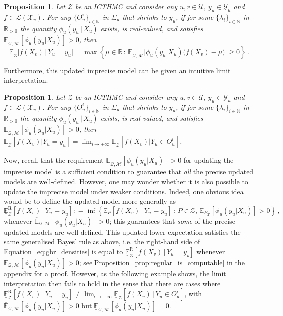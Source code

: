 \documentclass[3p]{elsarticle}
\newtheorem{proposition}[theorem]{Proposition}
\newcommand{\nats}{\mathbb{N}}
\newcommand{\reals}{\mathbb{R}}
\newcommand{\realspos}{\reals_{>0}}
\newcommand{\states}{\mathcal{X}}
\newcommand{\observs}{\mathcal{Y}}
\newcommand{\lexp}{\underline{\mathbb{E}}_{\rateset,\mathcal{M}}}
\newcommand{\uexp}{\overline{\mathbb{E}}_{\rateset,\mathcal{M}}}
\newcommand{\gambles}{\mathcal{L}}
\newcommand{\rateset}{\mathcal{Q}}
\newcommand{\coloneqq}{:\!=}
\begin{document}
\begin{proposition}\label{prop:GBR_for_densities_lower_zero}
Let $\mathcal{Z}$ be an ICTHMC and consider any $u,v\in\mathcal{U}$, $y_u\in\observs_u$ and $f\in\gambles(\states_v)$. For any $\{O_u^i\}_{i\in\nats}$ in $\Sigma_u$ that shrinks to $y_u$, if for some $\{\lambda_i\}_{i\in\nats}$ in $\realspos$ the quantity $\phi_u(y_u\,\vert\,X_u)$ exists, is real-valued, and satisfies $\lexp[\phi_u(y_u\vert X_u)]>0$, then
\begin{equation}\label{eq:gbr_densities}
\underline{\mathbb{E}}_{\mathcal{Z}}\bigl[f(X_v)\,\vert\,Y_u = y_u\bigr] = \max\left\{\mu\in\reals\,:\, \lexp\bigl[\phi_u(y_u\vert X_u)\bigl(f(X_v) - \mu\bigr)\bigr] \geq 0\right\}\,.
\end{equation}
\end{proposition}
Furthermore, this updated imprecise model can be given an intuitive limit interpretation.
\begin{proposition}\label{prop:GBR_for_densities_is_limit_if_continuous}
Let $\mathcal{Z}$ be an ICTHMC and consider any $u,v\in\mathcal{U}$, $y_u\in\observs_u$ and $f\in\gambles(\states_v)$. For any $\{O_u^i\}_{i\in\nats}$ in $\Sigma_u$ that shrinks to $y_u$, if for some $\{\lambda_i\}_{i\in\nats}$ in $\realspos$ the quantity $\phi_u(y_u\,\vert\,X_u)$ exists, is real-valued, and satisfies $\lexp[\phi_u(y_u\vert X_u)]>0$, then $\underline{\mathbb{E}}_\mathcal{Z}[f(X_v)\vert Y_u=y_u] 
 = \lim_{i\to+\infty}\underline{\mathbb{E}}_\mathcal{Z}[f(X_v)\vert Y_u\in O_u^i]$.
\end{proposition}

Now, recall that the requirement $\lexp[\phi_u(y_u\vert X_u)]>0$ for updating the imprecise model is a sufficient condition to guarantee that \emph{all} the precise updated models are well-defined. However, one may wonder whether it is also possible to update the imprecise model under weaker conditions. Indeed, one obvious idea would be to define the updated model more generally as
\begin{equation*}
\underline{\mathbb{E}}_\mathcal{Z}^\mathrm{R}[f(X_v)\,\vert\,Y_u=y_u] \coloneqq \inf\left\{ \mathbb{E}_P[f(X_v)\,\vert\,Y_u=y_u]\,:\, P\in\mathcal{Z},\,\mathbb{E}_{P_\states}[\phi_u(y_u\vert X_u)]>0 \right\}\,,
\end{equation*}
whenever $\uexp[\phi_u(y_u\vert X_u)]>0$; this guarantees that \emph{some} of the precise updated models are well-defined. This updated lower expectation satisfies the same generalised Bayes' rule as above, i.e. the right-hand side of Equation~\eqref{eq:gbr_densities} is equal to $\underline{\mathbb{E}}_\mathcal{Z}^\mathrm{R}[f(X_v)\,\vert\,Y_u=y_u]$ whenever $\uexp[\phi_u(y_u\vert X_u)]>0$; see Proposition~\ref{prop:regular_is_computable} in the appendix for a proof. However, as the following example shows, the limit interpretation then fails to hold in the sense that there are cases where $\underline{\mathbb{E}}_\mathcal{Z}^\mathrm{R}[f(X_v)\,\vert\,Y_u=y_u] \neq \lim_{i\to+\infty} \underline{\mathbb{E}}_\mathcal{Z}[f(X_v)\,\vert\,Y_u\in O_u^i]$, with $\uexp[\phi_u(y_u\vert X_u)]>0$ but $\lexp[\phi_u(y_u\vert X_u)]=0$. 
\end{document}
